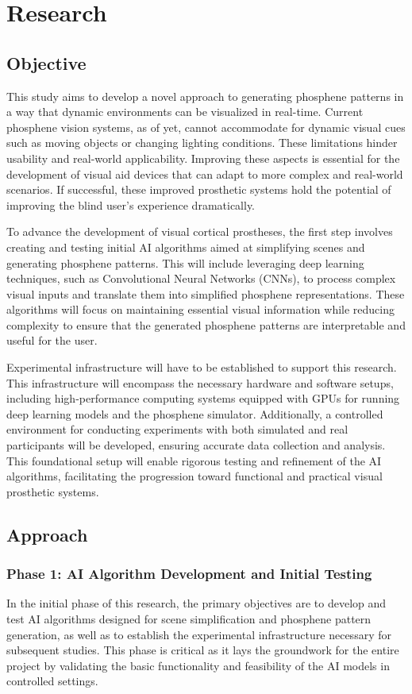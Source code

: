 \documentclass[10pt]{article}
\begin{document}
\section*{Research}\label{sec:research}
\subsection*{Objective}\label{subsec:objective}
This study aims to develop a novel approach to generating phosphene patterns in
a way that dynamic environments can be visualized in real-time. Current
phosphene vision systems, as of yet, cannot accommodate for dynamic visual cues
such as moving objects or changing lighting conditions. These limitations hinder
usability and real-world applicability. Improving these aspects is essential for
the development of visual aid devices that can adapt to more complex and
real-world scenarios. If successful, these improved prosthetic systems hold the
potential of improving the blind user's experience dramatically.

To advance the development of visual cortical prostheses, the first step
involves creating and testing initial AI algorithms aimed at simplifying scenes
and generating phosphene patterns. This will include leveraging deep learning
techniques, such as Convolutional Neural Networks (CNNs), to process complex
visual inputs and translate them into simplified phosphene representations.
These algorithms will focus on maintaining essential visual information while
reducing complexity to ensure that the generated phosphene patterns are
interpretable and useful for the user.

Experimental infrastructure will have to be established to support
this research. This infrastructure will encompass the necessary hardware and
software setups, including high-performance computing systems equipped with GPUs
for running deep learning models and the phosphene simulator. Additionally, a
controlled environment for conducting experiments with both simulated and real
participants will be developed, ensuring accurate data collection and analysis.
This foundational setup will enable rigorous testing and refinement of the AI
algorithms, facilitating the progression toward functional and practical visual
prosthetic systems.

\subsection*{Approach}\label{subsec:approach}
\subsubsection*{Phase 1: AI Algorithm Development and Initial Testing}
In the initial phase of this research, the primary objectives are to develop and
test AI algorithms designed for scene simplification and phosphene pattern
generation, as well as to establish the experimental infrastructure necessary
for subsequent studies. This phase is critical as it lays the groundwork for the
entire project by validating the basic functionality and feasibility of the AI
models in controlled settings.
\end{document}
